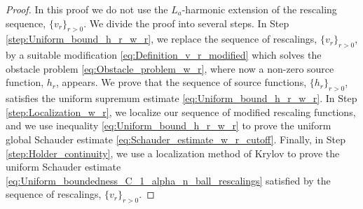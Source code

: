 \documentclass[11pt,reqno]{amsart}
\theoremstyle{definition}
\theoremstyle{remark}
\begin{document}
\begin{proof}
In this proof we do not use the $L_a$-harmonic extension of the rescaling sequence, $\{v_r\}_{r>0}$. We divide the proof into several steps. In Step \ref{step:Uniform_bound_h_r_w_r}, we replace the sequence of rescalings, $\{v_r\}_{r>0}$, by a suitable modification \eqref{eq:Definition_v_r_modified} which solves the obstacle problem \eqref{eq:Obstacle_problem_w_r}, where now a non-zero source function, $h_r$, appears. We prove that the sequence of source functions, $\{h_r\}_{r>0}$, satisfies the uniform supremum estimate \eqref{eq:Uniform_bound_h_r_w_r}. In Step \ref{step:Localization_w_r}, we localize our sequence of modified rescaling functions, and we use inequality \eqref{eq:Uniform_bound_h_r_w_r} to prove the uniform global Schauder estimate \eqref{eq:Schauder_estimate_w_r_cutoff}. Finally, in Step \ref{step:Holder_continuity}, we use a localization method of Krylov \cite[Theorem 8.11.1]{Krylov_LecturesHolder} to prove the uniform Schauder estimate \eqref{eq:Uniform_boundedness_C_1_alpha_n_ball_rescalings} satisfied by the sequence of rescalings, $\{v_r\}_{r>0}$.


\end{proof}
\end{document}
